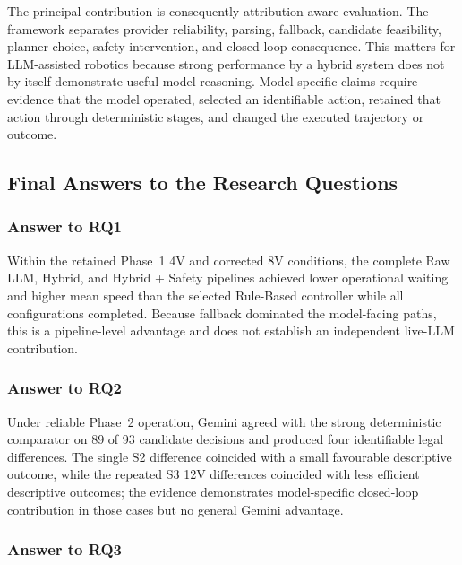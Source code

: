 \documentclass[letterpaper,10pt,conference]{ieeeconf}
\begin{document}
The principal contribution is consequently attribution-aware evaluation. The framework separates provider reliability, parsing, fallback, candidate feasibility, planner choice, safety intervention, and closed-loop consequence. This matters for LLM-assisted robotics because strong performance by a hybrid system does not by itself demonstrate useful model reasoning. Model-specific claims require evidence that the model operated, selected an identifiable action, retained that action through deterministic stages, and changed the executed trajectory or outcome.



\subsection{Final Answers to the Research Questions}



\subsubsection{Answer to RQ1}



Within the retained Phase~1 4V and corrected 8V conditions, the complete Raw LLM, Hybrid, and Hybrid + Safety pipelines achieved lower operational waiting and higher mean speed than the selected Rule-Based controller while all configurations completed. Because fallback dominated the model-facing paths, this is a pipeline-level advantage and does not establish an independent live-LLM contribution.



\subsubsection{Answer to RQ2}



Under reliable Phase~2 operation, Gemini agreed with the strong deterministic comparator on 89 of 93 candidate decisions and produced four identifiable legal differences. The single S2 difference coincided with a small favourable descriptive outcome, while the repeated S3 12V differences coincided with less efficient descriptive outcomes; the evidence demonstrates model-specific closed-loop contribution in those cases but no general Gemini advantage.



\subsubsection{Answer to RQ3}
\end{document}
